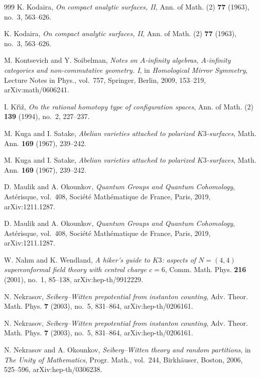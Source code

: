 \begin{thebibliography}{999}
K. Kodaira, \emph{On compact analytic surfaces, II}, Ann. of Math. (2) \textbf{77} (1963), no.~3, 563--626.

K. Kodaira, \emph{On compact analytic surfaces, II}, Ann. of Math. (2) \textbf{77} (1963), no.~3, 563--626.

M. Kontsevich and Y. Soibelman, \emph{Notes on $A$-infinity algebras, $A$-infinity categories and non-commutative geometry. I}, in \emph{Homological Mirror Symmetry}, Lecture Notes in Phys., vol.~757, Springer, Berlin, 2009, 153--219, arXiv:math/0606241.

I. K\v{r}\'{\i}\v{z}, \emph{On the rational homotopy type of configuration spaces}, Ann. of Math. (2) \textbf{139} (1994), no.~2, 227--237.

M. Kuga and I. Satake, \emph{Abelian varieties attached to polarized $K3$-surfaces}, Math. Ann. \textbf{169} (1967), 239--242.

M. Kuga and I. Satake, \emph{Abelian varieties attached to polarized $K3$-surfaces}, Math. Ann. \textbf{169} (1967), 239--242.

D. Maulik and A. Okounkov, \emph{Quantum Groups and Quantum Cohomology}, Ast\'erisque, vol.~408, Soci\'et\'e Math\'ematique de France, Paris, 2019, arXiv:1211.1287.

D. Maulik and A. Okounkov, \emph{Quantum Groups and Quantum Cohomology}, Ast\'erisque, vol.~408, Soci\'et\'e Math\'ematique de France, Paris, 2019, arXiv:1211.1287.

W. Nahm and K. Wendland, \emph{A hiker's guide to $K3$: aspects of $N=(4,4)$ superconformal field theory with central charge $c=6$}, Comm. Math. Phys. \textbf{216} (2001), no.~1, 85--138, arXiv:hep-th/9912229.

N. Nekrasov, \emph{Seiberg--Witten prepotential from instanton counting}, Adv. Theor. Math. Phys. \textbf{7} (2003), no.~5, 831--864, arXiv:hep-th/0206161.

N. Nekrasov, \emph{Seiberg--Witten prepotential from instanton counting}, Adv. Theor. Math. Phys. \textbf{7} (2003), no.~5, 831--864, arXiv:hep-th/0206161.

N. Nekrasov and A. Okounkov, \emph{Seiberg--Witten theory and random partitions}, in \emph{The Unity of Mathematics}, Progr. Math., vol.~244, Birkh\"auser, Boston, 2006, 525--596, arXiv:hep-th/0306238.


\end{thebibliography}
